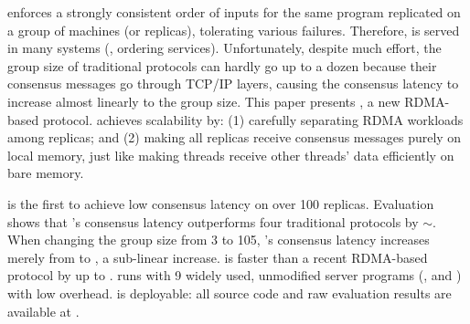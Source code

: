 


\paxos enforces a strongly consistent order of inputs for the same program 
replicated on a group of machines (or replicas), tolerating various failures. 
Therefore, \paxos is served in many systems (\eg, ordering services). 
Unfortunately, despite much effort, the group size of traditional \paxos 
protocols can hardly go up to a dozen because their consensus messages 
go through TCP/IP layers, causing the consensus latency to increase almost 
linearly to the group size. This paper presents \xxx, a new RDMA-based \paxos 
protocol. \xxx achieves scalability by: (1) carefully separating RDMA workloads 
among replicas; and (2) making all replicas receive consensus messages purely on 
local memory, just like making threads receive other threads' data efficiently 
on bare memory.

\xxx is the first to achieve low \paxos consensus latency on over 100 replicas. 
Evaluation shows that \xxx's consensus latency outperforms four 
traditional \paxos protocols by \comptradlow$\sim$\comptradhigh. When 
changing the group size from 3 to 105, \xxx's consensus latency 
increases merely from \xxxlatencythree \us to \xxxlatencyonezerofive \us, a 
sub-linear increase. \xxx is faster than a recent RDMA-based \paxos protocol by 
up to \fasterDARE. \xxx runs with 9 widely used, unmodified server programs 
(\eg, \redis and \mysql) with low overhead. \xxx is deployable: all source 
code and raw evaluation results are available at \github.

